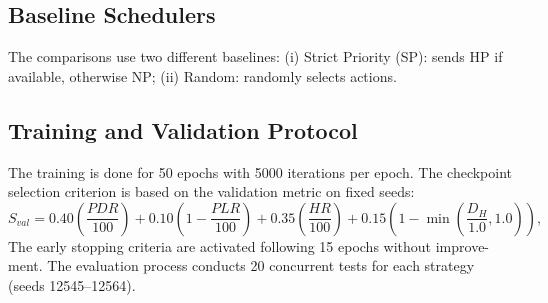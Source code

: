 \documentclass[runningheads,a4paper]{llncs}
\begin{document}
\subsection{Baseline Schedulers}
The comparisons use two different baselines: (i) Strict Priority (SP): sends
HP if available, otherwise NP; (ii) Random: randomly selects actions.

\subsection{Training and Validation Protocol}
The training is done for 50 epochs with 5000 iterations per epoch. The checkpoint
selection criterion is based on the validation metric on fixed seeds:
\begin{equation}
S_{val} = 0.40 \left(\frac{PDR}{100}\right) + 0.10 \left(1 - \frac{PLR}{100}\right) + 0.35 \left(\frac{HR}{100}\right) + 0.15 \left(1 - \min\left(\frac{D_H}{1.0}, 1.0\right)\right),
\end{equation}
The early stopping criteria are activated following 15 epochs without improve-
ment. The evaluation process conducts 20 concurrent tests for each strategy
(seeds 12545–12564).
\end{document}
